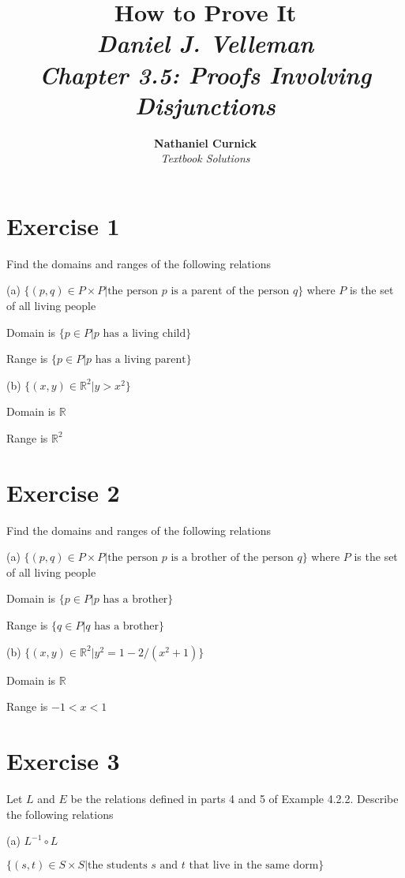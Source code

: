 \documentclass[11pt]{article}
\title{\textbf{How to Prove It} \\ {\Large\itshape Daniel J. Velleman} \\ {\Large\itshape Chapter 3.5: Proofs Involving Disjunctions}}
\author{\textbf{Nathaniel Curnick} \\ \textit{Textbook Solutions}}
\date{}
\begin{document}
\maketitle

\section*{Exercise 1}

Find the domains and ranges of the following relations

\noindent (a) $\{(p, q) \in P \times P | \text{the person } p \text{ is a parent of the person } q\}$
where $P$ is the set of all living people 

Domain is $\{p \in P | p \text{ has a living child}\}$

Range is $\{p \in P | p \text{ has a living parent}\}$

\noindent (b) $\{(x, y) \in \mathbb{R}^2 | y > x^2\}$

Domain is $\mathbb{R}$

Range is $\mathbb{R}^2$

\section*{Exercise 2}

Find the domains and ranges of the following relations 

\noindent (a) $\{(p, q) \in P \times P | \text{the person } p \text{ is a brother of the person } q\}$
where $P$ is the set of all living people 

Domain is $\{p \in P | p \text{ has a brother}\}$

Range is $\{q \in P | q \text{ has a brother}\}$

\noindent (b) $\{(x, y) \in \mathbb{R}^2 | y^2 = 1 - 2/(x^2 + 1)\}$

Domain is $\mathbb{R}$

Range is $-1 < x < 1$

\section*{Exercise 3}

Let $L$ and $E$ be the relations defined in parts 4 and 5 of Example 4.2.2.
Describe the following relations

\noindent (a) $L^{-1} \circ L$

$\{(s, t) \in S \times S | \text{the students } s \text{ and } t \text{ that live in the same dorm}\}$
\end{document}
